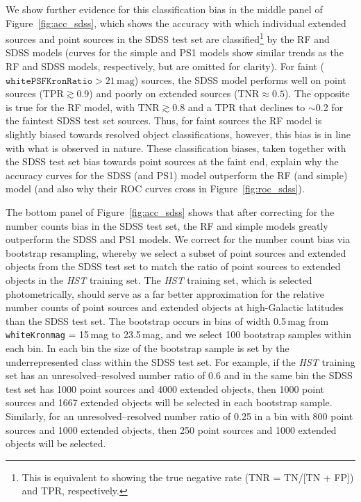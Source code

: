 \documentclass[twocolumn]{aastex62}
\begin{document}
\begin{CJK*}{UTF8}{gbsn}
We show further evidence for this classification bias in the middle panel of
Figure~\ref{fig:acc_sdss}, which shows the accuracy with which individual
extended sources and point sources in the SDSS test set are
classified\footnote{This is equivalent to showing the true negative rate
(TNR = TN/[TN + FP]) and TPR, respectively.} by the RF and SDSS models
(curves for the simple and PS1 models show similar trends as the RF and SDSS
models, respectively, but are omitted for clarity). For faint
($\mathtt{whitePSFKronRatio} > 21\,\mathrm{mag}$) sources, the SDSS model
performs well on point sources ($\mathrm{TPR} \gtrsim 0.9$) and poorly on
extended sources ($\mathrm{TNR} \approx 0.5$). The opposite is true for the
RF model, with $\mathrm{TNR} \gtrsim 0.8$ and a TPR that declines to
$\sim$0.2 for the faintest SDSS test set sources. Thus, for faint sources
the RF model is slightly biased towards resolved object classifications,
however, this bias is in line with what is observed in nature. These
classification biases, taken together with the SDSS test set bias towards
point sources at the faint end, explain why the accuracy curves for the SDSS
(and PS1) model outperform the RF (and simple) model (and also why their ROC
curves cross in Figure~\ref{fig:roc_sdss}).

The bottom panel of Figure~\ref{fig:acc_sdss} shows that after correcting
for the number counts bias in the SDSS test set, the RF and simple models
greatly outperform the SDSS and PS1 models. We correct for the number count
bias via bootstrap resampling, whereby we select a subset of point sources
and extended objects from the SDSS test set to match the ratio of point
sources to extended objects in the \textit{HST} training set. The
\textit{HST} training set, which is selected photometrically, should serve
as a far better approximation for the relative number counts of point
sources and extended objects at high-Galactic latitudes than the SDSS test
set. The bootstrap occurs in bins of width 0.5\,mag from
\texttt{whiteKronmag} = 15\,mag to 23.5\,mag, and we select 100 bootstrap
samples within each bin. In each bin the size of the bootstrap sample is set
by the underrepresented class within the SDSS test set. For example, if the
\textit{HST} training set has an unresolved--resolved number ratio of 0.6
and in the same bin the SDSS test set has 1000 point sources and 4000
extended objects, then 1000 point sources and 1667 extended objects will be
selected in each bootstrap sample. Similarly, for an unresolved--resolved
number ratio of 0.25 in a bin with 800 point sources and 1000 extended
objects, then 250 point sources and 1000 extended objects will be selected.


\end{CJK*}
\end{document}
